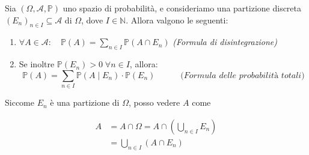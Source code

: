 \begin{teorema}
    Sia $(\Omega, \mathcal{A}, \mathbb{P})$ uno spazio di probabilità, e consideriamo una partizione discreta $(E_n)_{n\in I}\subseteq \mathcal{A}$ di $\Omega$, dove $I\in \mathbb{N}$. Allora valgono le seguenti:
    \begin{enumerate}
        \item $\forall A\in\mathcal{A}:\quad \boxed{\mathbb{P}(A) = \sum_{n\in I}\mathbb{P}(A\cap E_n)}$ \hfill \textit{(Formula di disintegrazione)}
        \item Se inoltre $\mathbb{P}(E_n)>0\;\forall n\in I$, allora: \[\boxed{\mathbb{P}(A) = \sum_{n\in I}\mathbb{P}(A\mid E_n)\cdot \mathbb{P}(E_n)} \qquad \quad\textit{(Formula delle probabilità totali)}\] 
    \end{enumerate}

    \begin{dimostrazione}
        Siccome $E_n$ è  una partizione di $\Omega$, posso vedere $A$ come 
\begin{center}
\begin{minipage}{0.48\textwidth}
\begin{align*}
    A &= A \cap \Omega 
   = A \cap \left(\bigcup_{n\in I} E_n\right)\\
   &= \bigcup_{n\in I} (A \cap E_n)
\end{align*}
\end{minipage}%
\hfill
\begin{minipage}{0.40\textwidth}
\end{minipage}
\end{center}
\end{dimostrazione}
\end{teorema}
